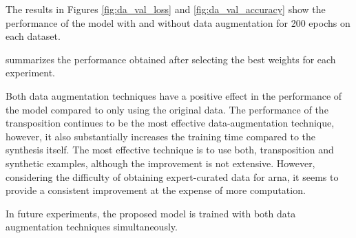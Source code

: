
The results in Figures \ref{fig:da_val_loss} and
\ref{fig:da_val_accuracy} show the performance of the model
with and without data augmentation for 200 epochs on each
dataset. 

summarizes the performance obtained after selecting the best
weights for each experiment.




Both data augmentation techniques have a positive effect in
the performance of the model compared to only using the
original data. The performance of the transposition
continues to be the most effective data-augmentation
technique, however, it also substantially increases the
training time compared to the synthesis itself. The most
effective technique is to use both, transposition and
synthetic examples, although the improvement is not
extensive. However, considering the difficulty of obtaining
expert-curated data for \gls{arna}, it seems to provide a
consistent improvement at the expense of more computation.

In future experiments, the proposed model is trained with
both data augmentation techniques simultaneously.

